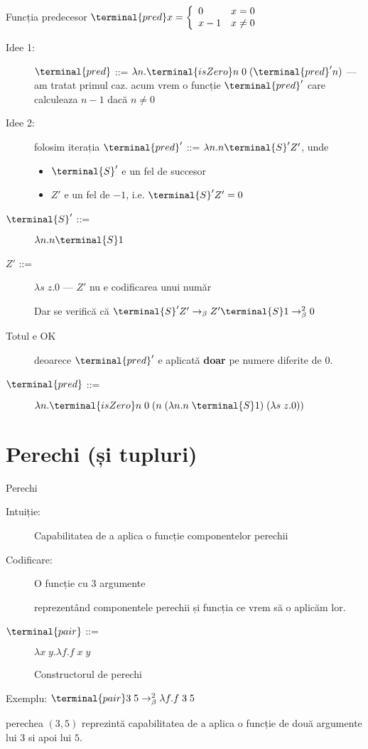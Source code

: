 \documentclass[xcolor=pdftex,romanian,colorlinks]{beamer}
\newcommand{\Ssucc}{\terminal{S}}
\newcommand{\Spred}{\terminal{pred}}
\newcommand{\SisZero}{\terminal{isZero}}
\newcommand{\Spair}{\terminal{pair}}
\begin{document}
\begin{frame}{Funcția predecesor
  $\Spred x = \left\{\begin{array}{lr}0 & x = 0\\x-1 & x\neq 0 \end{array}\right.$}

  \begin{description}
    \item[Idee 1:] $\Spred$ ::= $\lambda n.\SisZero n\; 0\;  (\Spred' n)$
           --- am tratat primul caz. acum vrem o funcție $\Spred'$ care calculeaza $n-1$ dacă $n\neq 0$
    \item[Idee 2:] folosim iterația $\Spred'$ ::= $\lambda n. n \Ssucc' Z'$, unde
         \begin{itemize}
          \item $\Ssucc'$ e un fel de succesor
          \item $Z'$ e un fel de $-1$, i.e. $\Ssucc' Z' = 0$
         \end{itemize}
    \item[$\Ssucc'$ ::= ] $\lambda n. n \Ssucc 1$
    \item[$Z'$ ::= ] $\lambda s\; z.0$ --- $Z'$ nu e codificarea unui număr

    Dar se verifică că $\Ssucc' Z' \rightarrow_\beta Z' \Ssucc 1 \rightarrow^2_\beta 0$

    \item[Totul e OK] deoarece $\Spred'$ e aplicată {\bf doar} pe numere diferite de 0.
    \item[$\Spred$ ::= ] $\lambda n.\SisZero n\; 0\; (n \; (\lambda n.n\; \Ssucc 1)\; (\lambda s\; z.0))$
  \end{description}
\end{frame}

\section{Perechi (și tupluri)}

\begin{frame}{Perechi}

  \begin{description}
    \item[Intuiție:] Capabilitatea de a aplica o funcție componentelor perechii
    \item[Codificare:] O funcție cu 3 argumente 
         
          reprezentând componentele perechii și funcția ce vrem să o aplicăm lor.
    \item[$\Spair$ ::=] $\lambda x\; y.\lambda f.f\; x\; y$

    Constructorul de perechi

  \end{description}
    \begin{block}{Exemplu: $\Spair 3\; 5 \rightarrow^2_\beta \lambda f.f\; 3\; 5$}
    
    perechea $(3,5)$
    reprezintă capabilitatea de a aplica o funcție de două argumente lui $3$ si apoi lui $5$.
    \end{block}
\end{frame}
\end{document}
